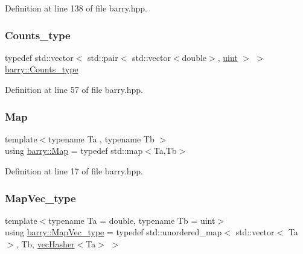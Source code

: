 Definition at line 138 of file barry.\+hpp.

\mbox{\label{namespacebarry_a3e2d8c3b6cf602107559d4237d9f1315}} 
\subsubsection{\texorpdfstring{Counts\+\_\+type}{Counts\_type}}
{\footnotesize\ttfamily typedef std\+::vector$<$ std\+::pair$<$ std\+::vector$<$double$>$, \hyperlink{namespacebarry_a11dfc53ddb4672278319aa04f1e09a6c}{uint} $>$ $>$ \hyperlink{namespacebarry_a3e2d8c3b6cf602107559d4237d9f1315}{barry\+::\+Counts\+\_\+type}}



Definition at line 57 of file barry.\+hpp.

\mbox{\label{namespacebarry_a979a04835a9855ff2054c383c569c89e}} 
\subsubsection{\texorpdfstring{Map}{Map}}
{\footnotesize\ttfamily template$<$typename Ta , typename Tb $>$ \\
using \hyperlink{namespacebarry_a979a04835a9855ff2054c383c569c89e}{barry\+::\+Map} = typedef std\+::map$<$Ta,Tb$>$}



Definition at line 17 of file barry.\+hpp.

\mbox{\label{namespacebarry_a2f0d3aab1d67e4c8eaeab9022e16139f}} 
\subsubsection{\texorpdfstring{Map\+Vec\+\_\+type}{MapVec\_type}}
{\footnotesize\ttfamily template$<$typename Ta  = double, typename Tb  = uint$>$ \\
using \hyperlink{namespacebarry_a2f0d3aab1d67e4c8eaeab9022e16139f}{barry\+::\+Map\+Vec\+\_\+type} = typedef std\+::unordered\+\_\+map$<$ std\+::vector$<$ Ta $>$, Tb, \hyperlink{structbarry_1_1vec_hasher}{vec\+Hasher}$<$Ta$>$ $>$}



